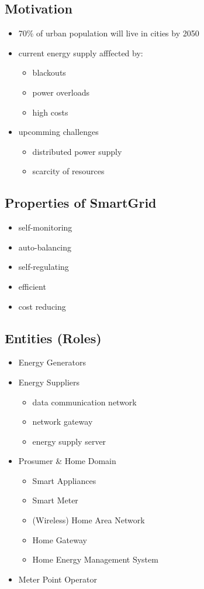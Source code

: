 \documentclass[a4paper, 12pt]{article}
\begin{document}
\subsection{Motivation}
\begin{itemize}
\item 70\% of urban population will live in cities by 2050
\item current energy supply afffected by:
\begin{itemize}
\item blackouts
\item power overloads
\item high costs
\end{itemize}
\item upcomming challenges
\begin{itemize}
\item distributed power supply
\item scarcity of resources
\end{itemize}
\end{itemize}
\subsection{Properties of SmartGrid}
\begin{itemize}
\item self-monitoring
\item auto-balancing
\item self-regulating
\item efficient
\item cost reducing
\end{itemize}

\subsection{Entities (Roles)}
\begin{itemize}
\item Energy Generators
\item Energy Suppliers
\begin{itemize}
\item data communication network
\item network gateway
\item energy supply server
\end{itemize}
\item Prosumer \& Home Domain
\begin{itemize}
\item Smart Appliances
\item Smart Meter
\item (Wireless) Home Area Network
\item Home Gateway
\item Home Energy Management System
\end{itemize}
\item Meter Point Operator
\end{itemize}
\end{document}
